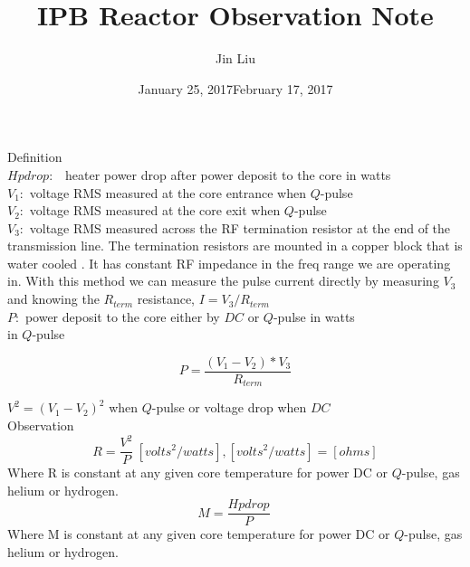\documentclass{article}
\title{IPB Reactor Observation Note}
\author{Jin Liu}
\date{January 25, 2017}
\date{February 17, 2017}
\begin{document}
\maketitle

Definition\\

$Hpdrop:$ \ heater power drop after power deposit to the core in watts\\

$V_{1}:$ voltage RMS measured at the core entrance when $Q$-pulse\\

$V_{2}:$ voltage RMS measured at the core exit when $Q$-pulse\\

$V_{3}:$ voltage RMS measured across the RF termination resistor at the end of the transmission line. The termination resistors are mounted in a copper block that is water cooled . It has constant RF impedance in the freq range we are operating in. With this method we can measure the pulse current directly by measuring $V_{3}$ and knowing the $R_{term}$ resistance, $I = V_{3} / R_{term}$ \\

$P:$ power deposit to the core either by $DC$ or $Q$-pulse in watts\\
in $Q$-pulse 

\begin{equation}
P=\frac{(V_{1}-V_{2})*V_{3}}{R_{term}} \label{1}%
\end{equation}
%

$V^{2}=(V_{1}-V_{2})^{2}$ when $Q$-pulse or voltage drop when $DC$ \\


Observation\\

\begin{equation}
R=\frac{V^{2}}{P}\ [volts^{2}/watts], [volts^{2}/watts]=[ohms]\label{3}%
\end{equation}
%
Where R is constant at any given core temperature for power DC or $Q$-pulse, gas helium or hydrogen.\\
\begin{equation}
M=\frac{Hpdrop}{P}\ \label{4}%
\end{equation}
%
Where M is constant at any given core temperature for power DC or $Q$-pulse, gas helium or hydrogen.\\
\end{document}
